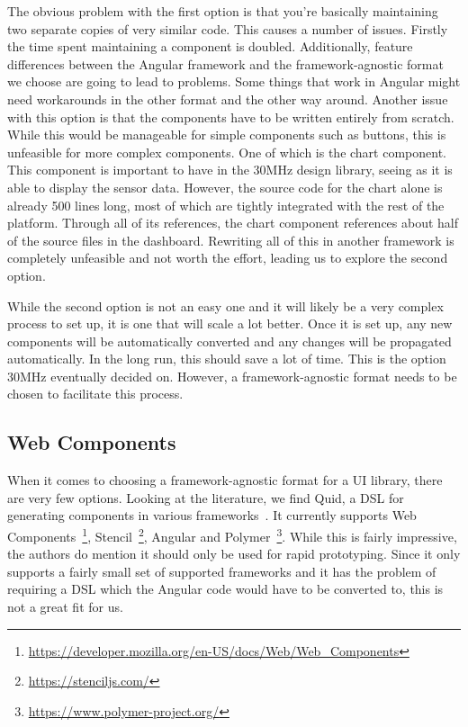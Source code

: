 The obvious problem with the first option is that you're basically maintaining two separate copies of very similar code. This causes a number of issues. Firstly the time spent maintaining a component is doubled. Additionally, feature differences between the Angular framework and the framework-agnostic format we choose are going to lead to problems. Some things that work in Angular might need workarounds in the other format and the other way around. Another issue with this option is that the components have to be written entirely from scratch. While this would be manageable for simple components such as buttons, this is unfeasible for more complex components. One of which is the chart component. This component is important to have in the 30MHz design library, seeing as it is able to display the sensor data. However, the source code for the chart alone is already 500 lines long, most of which are tightly integrated with the rest of the platform. Through all of its references, the chart component references about half of the source files in the dashboard. Rewriting all of this in another framework is completely unfeasible and not worth the effort, leading us to explore the second option.

While the second option is not an easy one and it will likely be a very complex process to set up, it is one that will scale a lot better. Once it is set up, any new components will be automatically converted and any changes will be propagated automatically. In the long run, this should save a lot of time. This is the option 30MHz eventually decided on. However, a framework-agnostic format needs to be chosen to facilitate this process.

\subsection{Web Components}\label{sec:bg-webcomponents}
When it comes to choosing a framework-agnostic format for a UI library, there are very few options. Looking at the literature, we find Quid, a DSL for generating components in various frameworks~\cite{molina2019quid}. It currently supports Web Components~\footnote{\url{https://developer.mozilla.org/en-US/docs/Web/Web_Components}}, Stencil~\footnote{\url{https://stenciljs.com/}}, Angular and Polymer~\footnote{\url{https://www.polymer-project.org/}}. While this is fairly impressive, the authors do mention it should only be used for rapid prototyping. Since it only supports a fairly small set of supported frameworks and it has the problem of requiring a DSL which the Angular code would have to be converted to, this is not a great fit for us.


